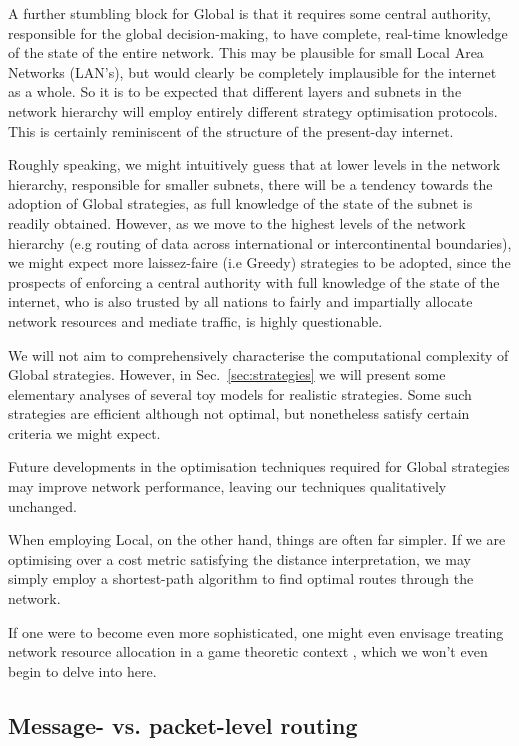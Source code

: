 \documentclass[aps,rmp,twocolumn,amsmath,amssymb,nofootinbib,superscriptaddress,longbibliography,floatfix]{revtex4-1}
\begin{document}
A further stumbling block for {\sc Global} is that it requires some central authority, responsible for the global decision-making, to have complete, real-time knowledge of the state of the entire network. This may be plausible for small Local Area Networks (LAN's), but would clearly be completely implausible for the internet as a whole. So it is to be expected that different layers and subnets in the network hierarchy will employ entirely different strategy optimisation protocols. This is certainly reminiscent of the structure of the present-day internet.

Roughly speaking, we might intuitively guess that at lower levels in the network hierarchy, responsible for smaller subnets, there will be a tendency towards the adoption of {\sc Global} strategies, as full knowledge of the state of the subnet is readily obtained. However, as we move to the highest levels of the network hierarchy (e.g routing of data across international or intercontinental boundaries), we might expect more laissez-faire (i.e {\sc Greedy}) strategies to be adopted, since the prospects of enforcing a central authority with full knowledge of the state of the internet, who is also trusted by all nations to fairly and impartially allocate network resources and mediate traffic, is highly questionable.

We will not aim to comprehensively characterise the computational complexity of {\sc Global} strategies. However, in Sec.~\ref{sec:strategies} we will present some elementary analyses of several toy models for realistic strategies. Some such strategies are efficient although not optimal, but nonetheless satisfy certain criteria we might expect.

Future developments in the optimisation techniques required for {\sc Global} strategies may improve network performance, leaving our techniques qualitatively unchanged.

When employing {\sc Local}, on the other hand, things are often far simpler. If we are optimising over a cost metric satisfying the distance interpretation, we may simply employ a shortest-path algorithm to find optimal routes through the network.

If one were to become even more sophisticated, one might even envisage treating network resource allocation in a game theoretic context \cite{???}, which we won't even begin to delve into here.

%
%

\subsection{Message- vs. packet-level routing}
\end{document}

